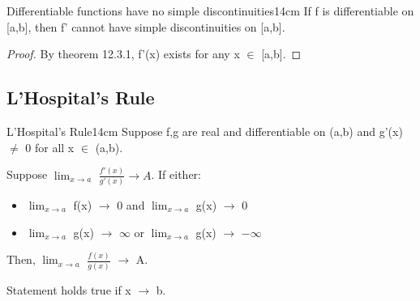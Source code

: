     \vspace{0.5cm}



    \begin{corollary}{Differentiable functions have no simple discontinuities}{14cm}
        If f is differentiable on [a,b], then f' cannot have simple discontinuities
        on [a,b].
    \end{corollary}

    \begin{proof}
        By {\color{red} theorem 12.3.1}, f'(x) exists for any x $\in$ [a,b].
    \end{proof}

    \newpage





\subsection{ L'Hospital's Rule }

    \begin{wtheorem}{L'Hospital's Rule}{14cm}
        Suppose f,g are real and differentiable on (a,b) and g'(x) $\not =$ 0
        for all x $\in$ (a,b).
        
        Suppose $\lim_{x \rightarrow a}$ $\frac{f'(x)}{g'(x)} \rightarrow A$.
        If either:
        
        \begin{itemize}[leftmargin=1cm, itemsep=0.1cm]
            \item                        
                $\lim_{x \rightarrow a}$ f(x) $\rightarrow$ 0 and
                $\lim_{x \rightarrow a}$ g(x) $\rightarrow$ 0

            \item
                $\lim_{x \rightarrow a}$ g(x) $\rightarrow$ $\infty$ or
                $\lim_{x \rightarrow a}$ g(x) $\rightarrow$ $-\infty$
        \end{itemize}

        Then, $\lim_{x \rightarrow a}$ $\frac{f(x)}{g(x)}$ $\rightarrow$ A.

        Statement holds true if x $\rightarrow$ b.
    \end{wtheorem}

